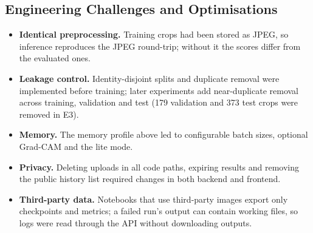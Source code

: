 \subsection{Engineering Challenges and Optimisations}
\begin{itemize}
\item \textbf{Identical preprocessing.} Training crops had been stored as JPEG, so inference reproduces the JPEG round-trip; without it the scores
differ from the evaluated ones.
\item \textbf{Leakage control.} Identity-disjoint splits and duplicate removal were implemented before training; later experiments add near-duplicate
removal across training, validation and test (179 validation and 373 test crops were removed in E3).
\item \textbf{Memory.} The memory profile above led to configurable batch sizes, optional Grad-CAM and the lite mode.
\item \textbf{Privacy.} Deleting uploads in all code paths, expiring results and removing the public history list required changes in
both backend and frontend.
\item \textbf{Third-party data.} Notebooks that use third-party images export only checkpoints and metrics; a failed run's output can contain
working files, so logs were read through the API without downloading outputs.
\end{itemize}
